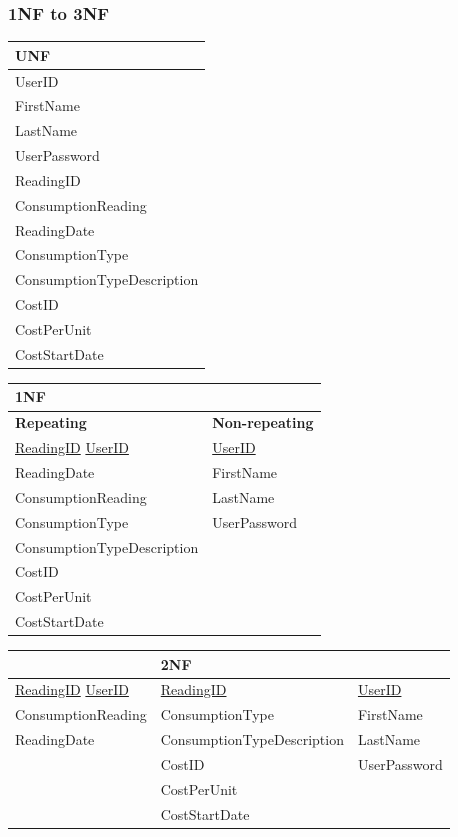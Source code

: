 \subsubsection{1NF to 3NF}
\begin{center}
	\begin{tabular}{|p{5cm}|}
		\hline
		\textbf{UNF} \\ \hline
		UserID \\ \hline
		FirstName \\ \hline
		LastName \\ \hline
		UserPassword \\ \hline
		ReadingID \\ \hline
		ConsumptionReading \\ \hline
		ReadingDate \\ \hline
		ConsumptionType \\ \hline
		ConsumptionTypeDescription \\ \hline
		CostID \\ \hline
		CostPerUnit \\ \hline
		CostStartDate \\ \hline
	\end{tabular}
	
	\begin{tabular}{|p{5cm}|p{3.5cm}|}
		\hline
		\textbf{1NF} &  \\ \hline
		\textbf{Repeating} & \textbf{Non-repeating} \\ \hline
		\underline{ReadingID} \underline{UserID} & \underline{UserID} \\ \hline
		ReadingDate & FirstName \\ \hline
		ConsumptionReading & LastName\\ \hline
		ConsumptionType & UserPassword \\ \hline
		ConsumptionTypeDescription & \\ \hline
		CostID & \\ \hline
		CostPerUnit & \\ \hline
		CostStartDate & \\ \hline
	\end{tabular}

	\begin{tabular}{|p{5cm}|p{5cm}|p{3cm}|}
		\hline
		& \textbf{2NF} & \\ \hline
		\underline{ReadingID} \underline{UserID} & \underline{ReadingID} & \underline{UserID} \\ \hline
		ConsumptionReading & ConsumptionType & FirstName \\ \hline
		ReadingDate & ConsumptionTypeDescription & LastName \\ \hline
		 & CostID & UserPassword \\ \hline
		 & CostPerUnit & \\ \hline
		 & CostStartDate & \\ \hline
	\end{tabular}


\end{center}
